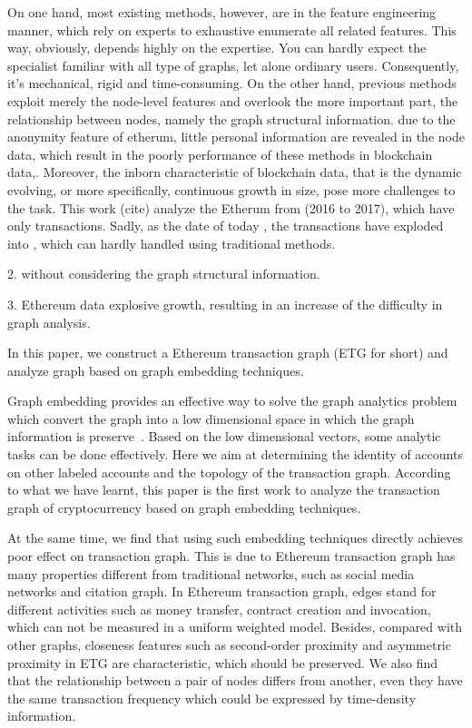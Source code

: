 On one hand, most existing methods, however, are in the feature engineering manner, which rely on experts to exhaustive enumerate all related features. This way, obviously, depends highly on the expertise. You can hardly expect the specialist familiar with all type of graphs, let alone ordinary users. Consequently, it's mechanical, rigid and time-consuming. On the other hand, previous methods exploit merely  the node-level features and overlook the more important part, the relationship between nodes, namely the graph structural information. due to  the anonymity feature of etherum, little personal information are revealed in the node data, which result in the poorly performance of these methods in blockchain data,.    Moreover, the inborn characteristic of blockchain data, that is the dynamic evolving, or more specifically, continuous growth in size, pose more challenges to the task. This work (cite) analyze the Etherum   from (2016 to 2017), which have only transactions. Sadly, as the date of today , the transactions have exploded into , which can hardly handled using traditional methods.

2. without considering the graph structural information.

3. Ethereum data explosive growth, resulting in an increase of the difficulty in graph analysis. %


 In this paper, we construct a Ethereum transaction graph (ETG for short) and analyze graph based on graph embedding techniques.

 Graph embedding provides an effective way to solve the graph analytics problem which convert the graph into a low dimensional space in which the graph information is preserve~\cite{cai2018comprehensive}. Based on the low dimensional vectors, some analytic tasks can be done effectively. Here we aim at determining the identity of accounts on other labeled accounts and the topology of the transaction graph. According to what we have learnt, this paper is the first work to analyze the transaction graph of cryptocurrency based on graph embedding techniques.

At the same time, we find that using such embedding techniques directly achieves poor effect on transaction graph. This is due to Ethereum transaction graph has many properties different from traditional networks, such as social media networks and citation graph. In Ethereum transaction graph, edges stand for different activities such as money transfer, contract creation and invocation, which can not be measured in a uniform weighted model. Besides, compared with other graphs, closeness features such as second-order proximity and asymmetric proximity in ETG are characteristic, which should be preserved. We also find that the relationship between a pair of nodes differs from another, even they have the same transaction frequency which could be expressed by time-density information.

